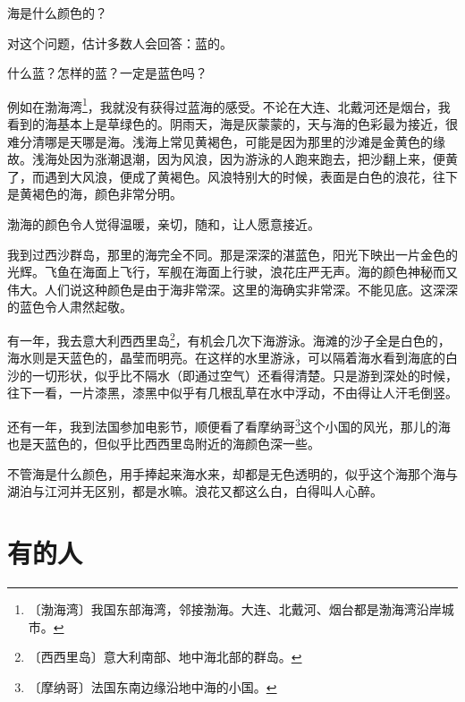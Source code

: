 \documentclass[12pt,UTF-8,openany]{ctexbook}
\begin{document}
\begin{large}
    
    海是什么颜色的？
    
    对这个问题，估计多数人会回答：蓝的。
    
    什么蓝？怎样的蓝？一定是蓝色吗？
    
    例如在渤海湾\footnote{〔渤海湾〕我国东部海湾，邻接渤海。大连、北戴河、烟台都是渤海湾沿岸城市。}，我就没有获得过蓝海的感受。不论在大连、北戴河还是烟台，我看到的海基本上是草绿色的。阴雨天，海是灰蒙蒙的，天与海的色彩最为接近，很难分清哪是天哪是海。浅海上常见黄褐色，可能是因为那里的沙滩是金黄色的缘故。浅海处因为涨潮退潮，因为风浪，因为游泳的人跑来跑去，把沙翻上来，便黄了，而遇到大风浪，便成了黄褐色。风浪特别大的时候，表面是白色的浪花，往下是黄褐色的海，颜色非常分明。
    
    渤海的颜色令人觉得温暖，亲切，随和，让人愿意接近。
    
    我到过西沙群岛，那里的海完全不同。那是深深的湛蓝色，阳光下映出一片金色的光辉。飞鱼在海面上飞行，军舰在海面上行驶，浪花庄严无声。海的颜色神秘而又伟大。人们说这种颜色是由于海非常深。这里的海确实非常深。不能见底。这深深的蓝色令人肃然起敬。
    
    有一年，我去意大利西西里岛\footnote{〔西西里岛〕意大利南部、地中海北部的群岛。}，有机会几次下海游泳。海滩的沙子全是白色的，海水则是天蓝色的，晶莹而明亮。在这样的水里游泳，可以隔着海水看到海底的白沙的一切形状，似乎比不隔水（即通过空气）还看得清楚。只是游到深处的时候，往下一看，一片漆黑，漆黑中似乎有几根乱草在水中浮动，不由得让人汗毛倒竖。
    
    还有一年，我到法国参加电影节，顺便看了看摩纳哥\footnote{〔摩纳哥〕法国东南边缘沿地中海的小国。}这个小国的风光，那儿的海也是天蓝色的，但似乎比西西里岛附近的海颜色深一些。
    
    不管海是什么颜色，用手捧起来海水来，却都是无色透明的，似乎这个海那个海与湖泊与江河并无区别，都是水嘛。浪花又都这么白，白得叫人心醉。
    
\end{large}



\chapter{有的人}
\end{document}
